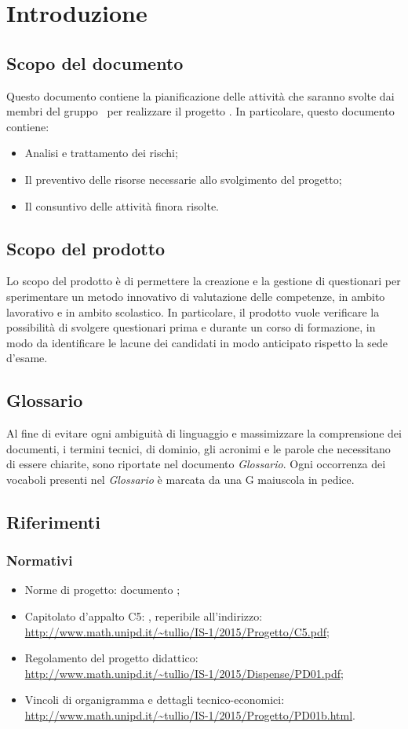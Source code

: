 \section{Introduzione}
\subsection{Scopo del documento}
Questo documento contiene la pianificazione delle attività che saranno svolte dai membri del gruppo \gruppo\ per realizzare il progetto \progetto. In particolare, questo documento contiene:

	\begin{itemize}
		\item Analisi e trattamento dei rischi;
		\item Il preventivo delle risorse necessarie allo svolgimento del progetto;
		\item Il consuntivo delle attività finora risolte.
	\end{itemize}
	
\subsection{Scopo del prodotto}
Lo scopo del prodotto è di permettere la creazione e la gestione di questionari per sperimentare un metodo innovativo di valutazione delle competenze, in ambito lavorativo e in ambito scolastico. In particolare, il prodotto vuole verificare la possibilità di svolgere questionari prima e durante un corso di formazione, in modo da identificare le lacune dei candidati in modo anticipato rispetto la sede d'esame.
\subsection{Glossario}
Al fine di evitare ogni ambiguità di linguaggio e massimizzare la comprensione dei documenti, i termini tecnici, di dominio, gli acronimi e le parole che necessitano di essere chiarite, sono riportate nel documento \textit{Glossario}. Ogni occorrenza dei vocaboli presenti nel \textit{Glossario} è marcata da una G maiuscola in pedice.
\subsection{Riferimenti}
\subsubsection{Normativi}
	\begin{itemize}
		\item Norme di progetto: documento \textit{\NdP};
		\item Capitolato d'appalto C5: \progetto, reperibile all'indirizzo:\\
		\url{http://www.math.unipd.it/~tullio/IS-1/2015/Progetto/C5.pdf};
		\item Regolamento del progetto didattico:\\
		\url{http://www.math.unipd.it/~tullio/IS-1/2015/Dispense/PD01.pdf};
		\item Vincoli di organigramma e dettagli tecnico-economici:\\
		\url{http://www.math.unipd.it/~tullio/IS-1/2015/Progetto/PD01b.html}.
	\end{itemize}
